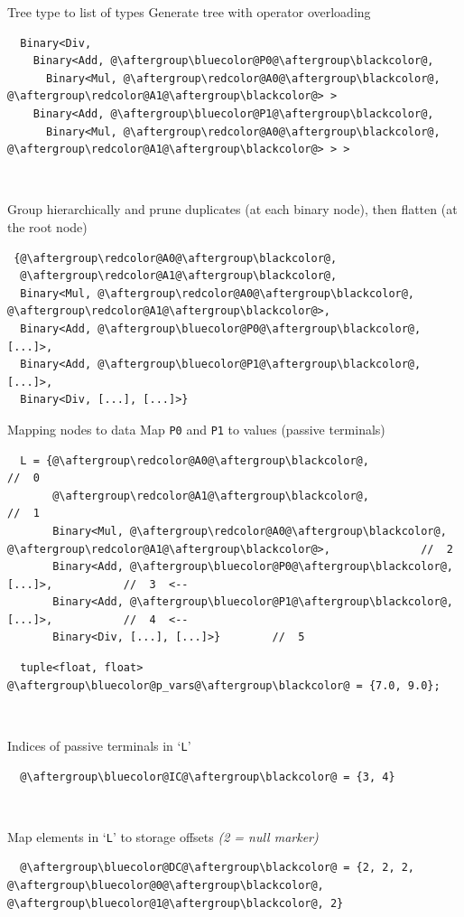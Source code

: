 \documentclass[xcolor=dvipsnames]{beamer}
\begin{document}
\begin{frame}[fragile]{Tree type to list of types}
Generate tree with operator overloading
\begin{lstlisting}
  Binary<Div,
    Binary<Add, @\aftergroup\bluecolor@P0@\aftergroup\blackcolor@,
      Binary<Mul, @\aftergroup\redcolor@A0@\aftergroup\blackcolor@, @\aftergroup\redcolor@A1@\aftergroup\blackcolor@> >
    Binary<Add, @\aftergroup\bluecolor@P1@\aftergroup\blackcolor@,
      Binary<Mul, @\aftergroup\redcolor@A0@\aftergroup\blackcolor@, @\aftergroup\redcolor@A1@\aftergroup\blackcolor@> > >
\end{lstlisting}

~

Group hierarchically and prune duplicates (at each binary node),\newline
then flatten (at the root node)
\begin{lstlisting}
 {@\aftergroup\redcolor@A0@\aftergroup\blackcolor@,
  @\aftergroup\redcolor@A1@\aftergroup\blackcolor@,
  Binary<Mul, @\aftergroup\redcolor@A0@\aftergroup\blackcolor@, @\aftergroup\redcolor@A1@\aftergroup\blackcolor@>,
  Binary<Add, @\aftergroup\bluecolor@P0@\aftergroup\blackcolor@, [...]>,
  Binary<Add, @\aftergroup\bluecolor@P1@\aftergroup\blackcolor@, [...]>,
  Binary<Div, [...], [...]>}
\end{lstlisting}
\end{frame}


\begin{frame}[fragile]{Mapping nodes to data}
Map {\color{blue}\texttt{P0}} and {\color{blue}\texttt{P1}} to values (passive terminals)
\begin{lstlisting}
  L = {@\aftergroup\redcolor@A0@\aftergroup\blackcolor@,                               //  0
       @\aftergroup\redcolor@A1@\aftergroup\blackcolor@,                               //  1
       Binary<Mul, @\aftergroup\redcolor@A0@\aftergroup\blackcolor@, @\aftergroup\redcolor@A1@\aftergroup\blackcolor@>,              //  2
       Binary<Add, @\aftergroup\bluecolor@P0@\aftergroup\blackcolor@, [...]>,           //  3  <--
       Binary<Add, @\aftergroup\bluecolor@P1@\aftergroup\blackcolor@, [...]>,           //  4  <--
       Binary<Div, [...], [...]>}        //  5
\end{lstlisting}
\begin{lstlisting}
  tuple<float, float> @\aftergroup\bluecolor@p_vars@\aftergroup\blackcolor@ = {7.0, 9.0};
\end{lstlisting}

~

Indices of passive terminals in `\texttt{L}'
\begin{lstlisting}
  @\aftergroup\bluecolor@IC@\aftergroup\blackcolor@ = {3, 4}
\end{lstlisting}

~

Map elements in `\texttt{L}' to storage offsets \emph{(2 = null marker)}
\begin{lstlisting}
  @\aftergroup\bluecolor@DC@\aftergroup\blackcolor@ = {2, 2, 2, @\aftergroup\bluecolor@0@\aftergroup\blackcolor@, @\aftergroup\bluecolor@1@\aftergroup\blackcolor@, 2}
\end{lstlisting}
\end{frame}
\end{document}
